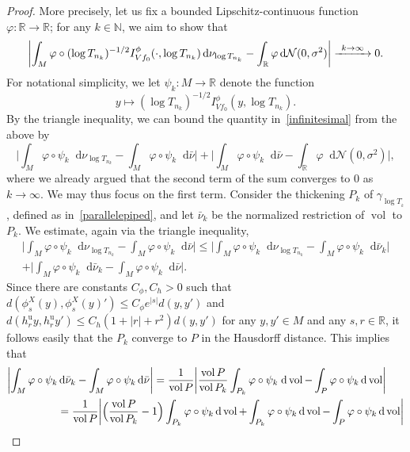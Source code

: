 \documentclass[11pt]{article}
\newcommand\To[1]{\mathchoice{\xrightarrow{\kern4pt#1\kern3pt}}{\stackrel{#1}{\longrightarrow}}{}{}}
\newcommand \R{\mathbb{R}}
\newcommand \N{\mathbb{N}}
\newcommand {\cN}{\mathcal{N}}
\newcommand*{\diff}{\mathop{}\!\mathrm{d}}
\DeclareMathOperator{\vol}{vol}
\theoremstyle{definition}
\begin{document}
\begin{appendix}
\begin{proof}
More precisely, let us fix a bounded Lipschitz-continuous function $\varphi\colon \R\to \R$; for any $k\in \N$, we aim to show that
\begin{equation}
\label{infinitesimal}
\biggl|\int_{M}\varphi\circ (\log{T_{n_k}})^{-1/2}I^{\phi}_{Vf_0}(\cdot,\log{T_{n_k}})\diff \nu_{\log{T_{n_k}}}-\int_{\R}\varphi\diff\cN(0,\sigma^{2})\biggr|\To{k\to\infty}0.
\end{equation}
For notational simplicity, we let $\psi_k\colon M\to \R$ denote the function
\[
y\longmapsto (\log{T_{n_k}})^{-1/2}I_{Vf_0}^{\phi}(y,\log{T_{n_k}}).
\]
By the triangle inequality, we can bound the quantity in~\eqref{infinitesimal} from the above by
\begin{equation*}
\biggl|\int_{M}\varphi\circ \psi_k \diff\nu_{\log{T_{n_k}}}-\int_{M}\varphi\circ \psi_k\diff\bar{\nu} \biggr|
+\biggl|\int_{M}\varphi\circ \psi_k\diff\bar{\nu} -\int_{\R}\varphi\diff\cN(0,\sigma^{2})\biggr|,
\end{equation*}
where we already argued that the second term of the sum converges to $0$ as $k\to\infty$. We may thus focus on the first term. Consider the thickening $P_k$ of $\gamma_{\log{T_{_k}}}$, defined as in~\eqref{parallelepiped}, and let $\bar{\nu}_k$ be the normalized restriction of $\vol$ to $P_k$.
We estimate, again via the triangle inequality,
\begin{multline*}
\biggl|\int_{M}\varphi\circ \psi_k\diff\nu_{\log{T_{n_k}}}-\int_{M}\varphi\circ \psi_k\diff\bar{\nu} \biggr|\leq
\biggl|\int_{M}\varphi\circ \psi_k\diff\nu_{\log{T_{n_k}}}-\int_{M}\varphi\circ \psi_k\diff\bar{\nu}_k \biggr|\\
+
\biggl|\int_{M}\varphi\circ \psi_k\diff\bar{\nu}_k-\int_{M}\varphi\circ \psi_k\diff\bar{\nu} \biggr|.
\end{multline*}
Since there are constants $C_{\phi},C_{h}>0$ such that $d(\phi^{X}_s(y),\phi^X_s(y)')\leq C_{\phi}e^{|s|}d(y,y')$ and $d(h^{\mathrm{u}}_ry,h^{\mathrm{u}}_ry')\leq C_{h}(1+|r|+r^{2})d(y,y')$ for any $y,y' \in M$ and any $s,r\in \R$, it follows easily that the $P_k$ converge to $P$ in the Hausdorff distance. This implies that
\begin{align*}
\biggl|\int_{M}\varphi\circ \psi_k&\diff\bar{\nu}_k-\int_{M}\varphi\circ \psi_k\diff\bar{\nu} \biggr|
=\frac{1}{\vol{P}}\biggl|\frac{\vol{P}}{\vol{P_k}}\int_{P_k}\varphi\circ \psi_k \; \text{d}\vol-\int_{P}\varphi\circ \psi_k\diff\vol\biggr|\\
&=\frac{1}{\vol{P}}\biggl|\Bigl(\frac{\vol{P}}{\vol{P_k}}-1\Bigr)\int_{P_k}\varphi\circ \psi_k\diff\vol+\int_{P_k}\varphi\circ \psi_k\diff\vol-\int_{P}\varphi\circ \psi_k\diff\vol\biggr|\\

\end{align*}
\end{proof}
\end{appendix}
\end{document}
